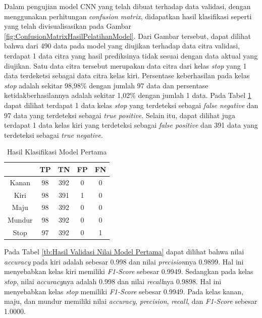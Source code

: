 Dalam pengujian model CNN yang telah dibuat terhadap data validasi, dengan menggunakan perhitungan \emph{confusion matrix}, didapatkan hasil klasifikasi seperti yang telah divisualisasikan pada Gambar \ref{fig:ConfusionMatrixHasilPelatihanModel}. Dari Gambar tersebut, dapat dilihat bahwa dari 490 data pada model yang diujikan terhadap data citra validasi, terdapat 1 data citra yang hasil prediksinya tidak sesuai dengan data aktual yang diujikan. Satu data citra tersebut merupakan data citra dari kelas \emph{stop} yang 1 data terdeketsi sebagai data citra kelas kiri. Persentase keberhasilan pada kelas \emph{stop} adalah sekitar 98,98\% dengan jumlah 97 data dan persentase ketidakberhasilannya adalah sekitar 1,02\% dengan jumlah 1 data. Pada Tabel \ref{tb:Hasil Klasifikasi Model Pertama} dapat dilihat terdapat 1 data kelas \emph{stop} yang terdeteksi sebagai \emph{false negative} dan 97 data yang terdeteksi sebagai \emph{true positive}. Selain itu, dapat dilihat juga terdapat 1 data kelas kiri yang terdeteksi sebagai \emph{false positive} dan 391 data yang terdeteksi sebagai \emph{true negative}.


\begin{table}[H]
  \centering
  \caption{Hasil Klasifikasi Model Pertama}
  \label{tb:Hasil Klasifikasi Model Pertama}
  \begin{tabular}{|c|c|c|c|c|}
  \hline
  \rowcolor[HTML]{9B9B9B} 
  \cellcolor[HTML]{9B9B9B} & TP & TN  & FP & FN \\ \hline
  Kanan                    & 98 & 392 & 0  & 0  \\ \hline
  Kiri                     & 98 & 391 & 1  & 0  \\ \hline
  Maju                     & 98 & 392 & 0  & 0  \\ \hline
  Mundur                   & 98 & 392 & 0  & 0  \\ \hline
  Stop                     & 97 & 392 & 0  & 1  \\ \hline
  \end{tabular}
  \end{table}

  Pada Tabel \ref{tb:Hasil Validasi Nilai Model Pertama} dapat dilihat bahwa nilai \emph{accuracy} pada kiri adalah sebesar 0.998 dan nilai \emph{precision}nya 0.9899. Hal ini menyebabkan kelas kiri memiliki \emph{F1-Score} sebesar 0.9949. Sedangkan pada kelas \emph{stop}, nilai \emph{accuracy}nya adalah 0.998 dan nilai \emph{recall}nya 0.9898. Hal ini menyebabkan kelas \emph{stop} memiliki \emph{F1-Score} sebesar 0.9949. Pada kelas kanan, maju, dan mundur memiliki nilai \emph{accuracy}, \emph{precision}, \emph{recall}, dan \emph{F1-Score} sebesar 1.0000.

